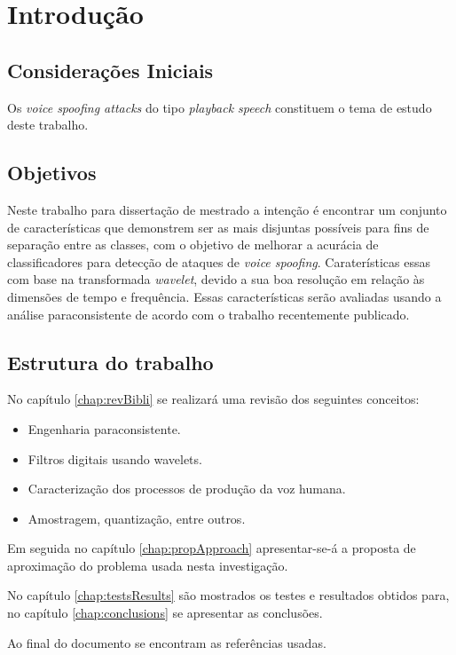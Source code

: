\chapter{Introdução}
	\begin{myenv}{1.5}
		\section{Considerações Iniciais}
			\par Os \textit{voice spoofing attacks} do tipo \textit{playback speech} constituem o tema de estudo deste trabalho.
						 
		\section{Objetivos}
			\par Neste trabalho para dissertação de mestrado a intenção é encontrar um conjunto de características que demonstrem ser as mais disjuntas possíveis para fins de separação entre as classes, com o objetivo de melhorar a acurácia de classificadores para detecção de ataques de \textit{voice spoofing}. Caraterísticas essas com base na transformada \textit{wavelet}, devido a sua boa resolução em relação às dimensões de tempo e frequência. Essas características serão avaliadas usando a análise paraconsistente de acordo com o trabalho \cite{8588433} recentemente publicado.
			
		\section{Estrutura do trabalho}
			\par No capítulo \ref{chap:revBibli} se realizará uma revisão dos seguintes conceitos:
			\begin{itemize}
				\item Engenharia paraconsistente.
				\item Filtros digitais usando wavelets.
				\item Caracterização dos processos de produção da voz humana.
				\item Amostragem, quantização, entre outros.
			\end{itemize}
			\par Em seguida no capítulo \ref{chap:propApproach} apresentar-se-á a proposta de aproximação do problema usada nesta investigação. 
			\par No capítulo \ref{chap:testsResults} são mostrados os testes e resultados obtidos para, no capítulo \ref{chap:conclusions} se apresentar as conclusões.
			\par Ao final do documento se encontram as referências usadas.
		
		
	\end{myenv}